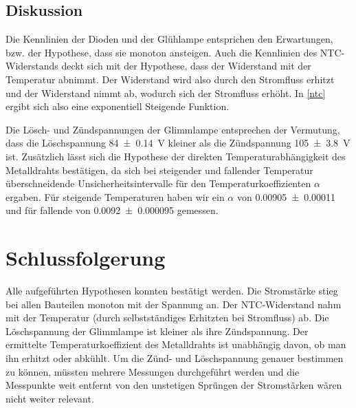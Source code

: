 \documentclass[
	a4paper,
	12pt,
	pagesize,
	ngerman
]{scrartcl}
\begin{document}
	\subsection{Diskussion}
	Die Kennlinien der Dioden und der Glühlampe entsprichen den Erwartungen, bzw. der Hypothese, dass sie monoton ansteigen.
	Auch die Kennlinien des NTC-Widerstands deckt sich mit der Hypothese, dass der Widerstand mit der Temperatur abnimmt.
	Der Widerstand wird also durch den Stromfluss erhitzt und der Widerstand nimmt ab, wodurch sich der Stromfluss erhöht.
	In \cref{ntc} ergibt sich also eine exponentiell Steigende Funktion.
	
	Die Lösch- und Zündspannungen der Glimmlampe entsprechen der Vermutung, dass die Löschspannung \SI{84\pm 0,14}{V} kleiner als die Zündspannung \SI{105\pm3,8}{V} ist.
	Zusätzlich lässt sich die Hypothese der direkten Temperaturabhängigkeit des Metalldrahts bestätigen, da sich bei steigender und fallender Temperatur überschneidende Unsicherheitsintervalle für den Temperaturkoeffizienten $\alpha$ ergaben.
	Für steigende Temperaturen haben wir ein $\alpha$ von \SI{0,00905\pm 0,00011}{} und für fallende von \SI{0,0092\pm 0,000095}{} gemessen.
	
	\section{Schlussfolgerung}
	Alle aufgeführten Hypothesen konnten bestätigt werden.
	Die Stromstärke stieg bei allen Bauteilen monoton mit der Spannung an.
	Der NTC-Widerstand nahm mit der Temperatur (durch selbstständiges Erhitzten bei Stromfluss) ab.
	Die Löschspannung der Glimmlampe ist kleiner als ihre Zündspannung.
	Der ermittelte Temperaturkoeffizient des Metalldrahts ist unabhängig davon, ob man ihn erhitzt oder abkühlt.
	Um die Zünd- und Löschspannung genauer bestimmen zu können, müssten mehrere Messungen durchgeführt werden und die Messpunkte weit entfernt von den unstetigen Sprüngen der Stromstärken wären nicht weiter relevant.
	
	\printbibliography
\end{document}
